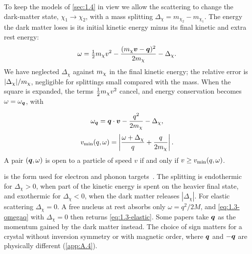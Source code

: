 To keep the models of \cref{sec:1.4} in view we allow the scattering to change the dark-matter state, $\chi_1 \to \chi_2$, with a mass splitting $\Delta_\chi = m_{\chi_2} - m_{\chi_1}$. The energy the dark matter loses is its initial kinetic energy minus its final kinetic and extra rest energy:
\begin{equation*}
  \omega = \tfrac12m_{\chi} v^2 - \frac{(m_{\chi}\bm{v} - \bm{q})^2}{2m_{\chi}} - \Delta_\chi .
\end{equation*}
We have neglected $\Delta_\chi$ against $m_{\chi}$ in the final kinetic energy; the relative error is $|\Delta_\chi|/m_{\chi}$, negligible for splittings small compared with the mass. When the square is expanded, the terms $\tfrac12m_{\chi} v^2$ cancel, and energy conservation becomes $\omega = \omega_{\bm{q}}$, with
\begin{keyresult}
\begin{equation}
  \omega_{\bm{q}} = \bm{q}\cdot\bm{v} - \frac{q^2}{2m_{\chi}} - \Delta_\chi ,
  \label{eq:1.3-omegaq}
\end{equation}
\begin{equation}
  v_{\mathrm{min}}(q, \omega) = \left|\frac{\omega + \Delta_\chi}{q} + \frac{q}{2m_{\chi}}\right| .
  \label{eq:1.3-vmin}
\end{equation}
A pair $(\bm{q}, \omega)$ is open to a particle of speed $v$ if and only if $v \ge v_{\mathrm{min}}(q, \omega)$.
\end{keyresult}
\noindent {} is the form used for electron and phonon targets~\cites[Eq.~(9)]{kahn2022searches}[Eq.~(116)]{lin2019tasi}[Eq.~(3.2)]{essig2016direct}. The splitting is endothermic for $\Delta_\chi > 0$, when part of the kinetic energy is spent on the heavier final state, and exothermic for $\Delta_\chi < 0$, when the dark matter releases $|\Delta_\chi|$. For elastic scattering $\Delta_\chi = 0$. A free nucleus at rest absorbs only $\omega = q^2/2M$, and \cref{eq:1.3-omegaq} with $\Delta_\chi = 0$ then returns \cref{eq:1.3-elastic}. Some papers take $\bm{q}$ as the momentum gained by the dark matter instead. The choice of sign matters for a crystal without inversion symmetry or with magnetic order, where $\bm{q}$ and $-\bm{q}$ are physically different (\cref{app:A.4}).


